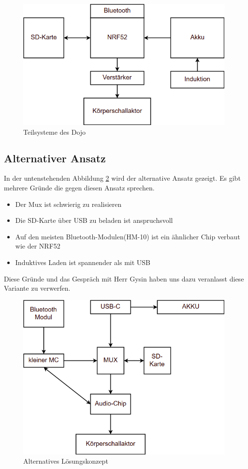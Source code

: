 \begin{figure}[H]
\begin{center}
	\includegraphics[width=110mm]{data/Loesungskonzept_Teilsysteme.png}
	\caption{Teilsysteme des Dojo} %
	\label{fig:Teilsysteme}
\end{center}
\end{figure}


\subsection{Alternativer Ansatz}
In der untenstehenden Abbildung \ref{fig:alternatives_loesungskonzept} wird der alternative Ansatz gezeigt. Es gibt mehrere Gründe die gegen diesen Ansatz sprechen.
\begin{itemize}
\item Der Mux ist schwierig zu realisieren
\item Die SD-Karte über USB zu beladen ist anspruchsvoll
\item Auf den meisten Bluetooth-Modulen(HM-10) ist ein ähnlicher Chip verbaut wie der NRF52
\item Induktives Laden ist spannender als mit USB
\end{itemize}
Diese Gründe und das Gespräch mit Herr Gysin haben uns dazu veranlasst diese Variante zu verwerfen.

\begin{figure}[H]
\begin{center}
	\includegraphics[width=110mm]{data/Loesungskonzept_alternativ.png}
	\caption{Alternatives Lösungskonzept} %
	\label{fig:alternatives_loesungskonzept}
\end{center}
\end{figure}


